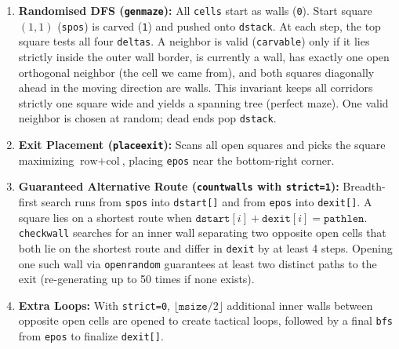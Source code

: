 \documentclass[11pt,a4paper]{article}
\begin{document}
\begin{enumerate}
    \item \textbf{Randomised DFS (\texttt{genmaze}):} All \texttt{cells} start as walls (\texttt{0}). Start square $(1,1)$ (\texttt{spos}) is carved (\texttt{1}) and pushed onto \texttt{dstack}. At each step, the top square tests all four \texttt{deltas}. A neighbor is valid (\texttt{carvable}) only if it lies strictly inside the outer wall border, is currently a wall, has exactly one open orthogonal neighbor (the cell we came from), and both squares diagonally ahead in the moving direction are walls. This invariant keeps all corridors strictly one square wide and yields a spanning tree (perfect maze). One valid neighbor is chosen at random; dead ends pop \texttt{dstack}.
    \item \textbf{Exit Placement (\texttt{placeexit}):} Scans all open squares and picks the square maximizing $\text{row} + \text{col}$, placing \texttt{epos} near the bottom-right corner.
    \item \textbf{Guaranteed Alternative Route (\texttt{countwalls} with \texttt{strict=1}):} Breadth-first search runs from \texttt{spos} into \texttt{dstart[]} and from \texttt{epos} into \texttt{dexit[]}. A square lies on a shortest route when $\texttt{dstart}[i] + \texttt{dexit}[i] = \texttt{pathlen}$. \texttt{checkwall} searches for an inner wall separating two opposite open cells that both lie on the shortest route and differ in \texttt{dexit} by at least 4 steps. Opening one such wall via \texttt{openrandom} guarantees at least two distinct paths to the exit (re-generating up to 50 times if none exists).
    \item \textbf{Extra Loops:} With \texttt{strict=0}, $\lfloor \texttt{msize}/2 \rfloor$ additional inner walls between opposite open cells are opened to create tactical loops, followed by a final \texttt{bfs} from \texttt{epos} to finalize \texttt{dexit[]}.
\end{enumerate}
\end{document}
